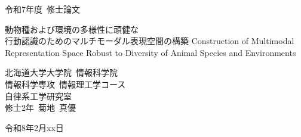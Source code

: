 \begin{titlepage}
\parindent=0pt
\vspace*{4zh}
\begin{center}
  {\large 令和7年度~修士論文 }
\end{center}
\vspace*{10zh}
\begin{center}
{\headfont\LARGE
動物種および環境の多様性に頑健な\\
行動認識のためのマルチモーダル表現空間の構築
}
{\Large Construction of Multimodal Representation Space Robust to Diversity of Animal Species and Environments}
\end{center}
\vspace*{10zh}
\begin{center}
  { \Large%
    北海道大学大学院~情報科学院 \\[0.1\baselineskip]
    情報科学専攻~情報理工学コース\\[0.4\baselineskip]
    自律系工学研究室\\[0.4\baselineskip]
    修士2年~菊地~真優 }
\end{center}
\vspace*{2zh}
\begin{center}
  {\large 令和8年2月xx日 }
\end{center}
\end{titlepage}